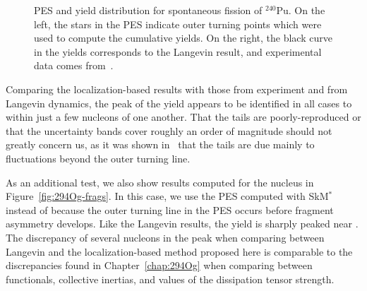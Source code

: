 \begin{figure}%
	\centering
	\qquad
	\caption{PES and yield distribution for spontaneous fission of $^{240}$Pu. On the left, the stars in the PES indicate outer turning points which were used to compute the cumulative yields. On the right, the black curve in the yields corresponds to the Langevin result, and experimental data comes from~\cite{Laidler1962, Thierens1981}.}%
	\label{fig:240Pu-yield}%
\end{figure}

Comparing the localization-based results with those from experiment and from Langevin dynamics, the peak of the yield appears to be identified in all cases to within just a few nucleons of one another. That the tails are poorly-reproduced or that the uncertainty bands cover roughly an order of magnitude should not greatly concern us, as it was shown in~\cite{Sadhukhan2016, Sadhukhan2017} that the tails are due mainly to fluctuations beyond the outer turning line.

As an additional test, we also show results computed for the nucleus {\Og} in Figure~\ref{fig:294Og-frags}. In this case, we use the PES computed with SkM$^*$ instead of {\hfb} because the outer turning line in the {\hfb} PES occurs before fragment asymmetry develops. Like the Langevin results, the yield is sharply peaked near {\Pb}. The discrepancy of several nucleons in the peak when comparing between Langevin and the localization-based method proposed here is comparable to the discrepancies found in Chapter~\ref{chap:294Og} when comparing between functionals, collective inertias, and values of the dissipation tensor strength.

